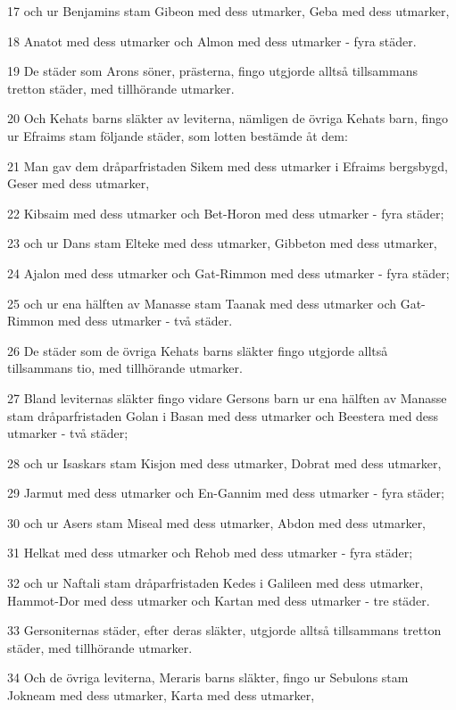 \par 17 och ur Benjamins stam Gibeon med dess utmarker, Geba med dess utmarker,
\par 18 Anatot med dess utmarker och Almon med dess utmarker - fyra städer.
\par 19 De städer som Arons söner, prästerna, fingo utgjorde alltså tillsammans tretton städer, med tillhörande utmarker.
\par 20 Och Kehats barns släkter av leviterna, nämligen de övriga Kehats barn, fingo ur Efraims stam följande städer, som lotten bestämde åt dem:
\par 21 Man gav dem dråparfristaden Sikem med dess utmarker i Efraims bergsbygd, Geser med dess utmarker,
\par 22 Kibsaim med dess utmarker och Bet-Horon med dess utmarker - fyra städer;
\par 23 och ur Dans stam Elteke med dess utmarker, Gibbeton med dess utmarker,
\par 24 Ajalon med dess utmarker och Gat-Rimmon med dess utmarker - fyra städer;
\par 25 och ur ena hälften av Manasse stam Taanak med dess utmarker och Gat-Rimmon med dess utmarker - två städer.
\par 26 De städer som de övriga Kehats barns släkter fingo utgjorde alltså tillsammans tio, med tillhörande utmarker.
\par 27 Bland leviternas släkter fingo vidare Gersons barn ur ena hälften av Manasse stam dråparfristaden Golan i Basan med dess utmarker och Beestera med dess utmarker - två städer;
\par 28 och ur Isaskars stam Kisjon med dess utmarker, Dobrat med dess utmarker,
\par 29 Jarmut med dess utmarker och En-Gannim med dess utmarker - fyra städer;
\par 30 och ur Asers stam Miseal med dess utmarker, Abdon med dess utmarker,
\par 31 Helkat med dess utmarker och Rehob med dess utmarker - fyra städer;
\par 32 och ur Naftali stam dråparfristaden Kedes i Galileen med dess utmarker, Hammot-Dor med dess utmarker och Kartan med dess utmarker - tre städer.
\par 33 Gersoniternas städer, efter deras släkter, utgjorde alltså tillsammans tretton städer, med tillhörande utmarker.
\par 34 Och de övriga leviterna, Meraris barns släkter, fingo ur Sebulons stam Jokneam med dess utmarker, Karta med dess utmarker,
